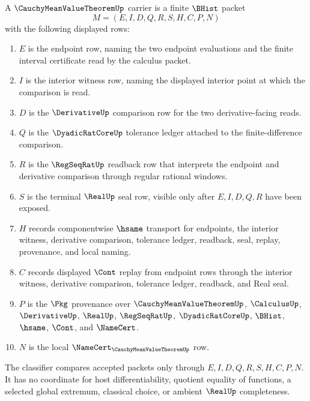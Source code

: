 \begin{definition}\label{def:cauchy-mean-value-theorem-carrier}
A $\CauchyMeanValueTheoremUp$ carrier is a finite $\BHist$ packet
$$
M=(E,I,D,Q,R,S,H,C,P,N)
$$
with the following displayed rows:
\begin{enumerate}
\item $E$ is the endpoint row, naming the two endpoint evaluations and the finite interval certificate read by the calculus packet.
\item $I$ is the interior witness row, naming the displayed interior point at which the comparison is read.
\item $D$ is the $\DerivativeUp$ comparison row for the two derivative-facing reads.
\item $Q$ is the $\DyadicRatCoreUp$ tolerance ledger attached to the finite-difference comparison.
\item $R$ is the $\RegSeqRatUp$ readback row that interprets the endpoint and derivative comparison through regular rational windows.
\item $S$ is the terminal $\RealUp$ seal row, visible only after $E,I,D,Q,R$ have been exposed.
\item $H$ records componentwise $\hsame$ transport for endpoints, the interior witness, derivative comparison, tolerance ledger, readback, seal, replay, provenance, and local naming.
\item $C$ records displayed $\Cont$ replay from endpoint rows through the interior witness, derivative comparison, tolerance ledger, readback, and Real seal.
\item $P$ is the $\Pkg$ provenance over $\CauchyMeanValueTheoremUp$, $\CalculusUp$, $\DerivativeUp$, $\RealUp$, $\RegSeqRatUp$, $\DyadicRatCoreUp$, $\BHist$, $\hsame$, $\Cont$, and $\NameCert$.
\item $N$ is the local $\NameCert_{\CauchyMeanValueTheoremUp}$ row.
\end{enumerate}
The classifier compares accepted packets only through $E,I,D,Q,R,S,H,C,P,N$. It has no coordinate for host differentiability, quotient equality of functions, a selected global extremum, classical choice, or ambient $\RealUp$ completeness.
\end{definition}

